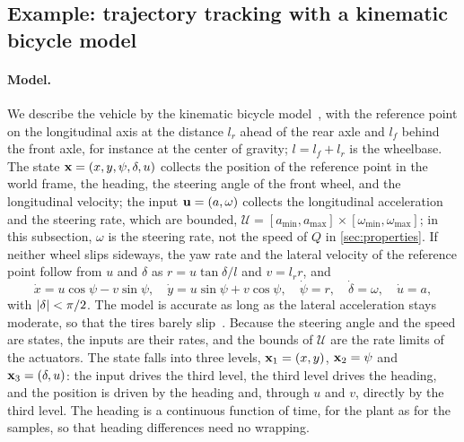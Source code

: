 
\subsection{Example: trajectory tracking with a kinematic bicycle model}
\label{sec:example-bicycle}


\paragraph{Model.}
We describe the vehicle by the kinematic bicycle model~\citep{rajamani2012vehicle,kong2015kinematic},
with the reference point on the longitudinal axis at the distance $l_r$ ahead of the rear axle and
$l_f$ behind the front axle, for instance at the center of gravity; $l = l_f + l_r$ is the
wheelbase.
The state $\mathbf{x} = (x,y,\psi,\delta,u)$ collects the position of the reference point in the world
frame, the heading, the steering angle of the front wheel, and the longitudinal velocity; the input
$\mathbf{u} = (a,\omega)$ collects the longitudinal acceleration and the steering rate, which are bounded,
$\mathcal{U} = [a_{\min},a_{\max}]\times[\omega_{\min},\omega_{\max}]$; in this subsection, $\omega$
is the steering rate, not the speed of $Q$ in \cref{sec:properties}.
If neither wheel slips sideways, the yaw rate and the lateral velocity of the reference point follow
from $u$ and $\delta$ as $r = u\tan\delta/l$ and $v = l_r r$, and
\begin{equation}\label{eq:bicycle}
    \dot x = u\cos\psi - v\sin\psi, \quad
    \dot y = u\sin\psi + v\cos\psi, \quad
    \dot\psi = r, \quad
    \dot\delta = \omega, \quad
    \dot u = a,
\end{equation}
with $\lvert\delta\rvert < \pi/2$.
The model is accurate as long as the lateral acceleration stays moderate, so that the tires barely
slip~\citep{kong2015kinematic,polack2017kinematic}.
Because the steering angle and the speed are states, the inputs are their rates, and the bounds of
$\mathcal{U}$ are the rate limits of the actuators.
The state falls into three levels, $\mathbf{x}_1 = (x,y)$, $\mathbf{x}_2 = \psi$ and $\mathbf{x}_3 = (\delta,u)$: the
input drives the third level, the third level drives the heading, and the position is driven by the
heading and, through $u$ and $v$, directly by the third level.
The heading is a continuous function of time, for the plant as for the samples, so that heading
differences need no wrapping.


